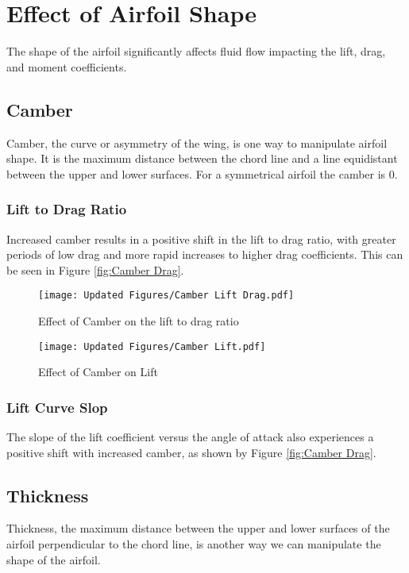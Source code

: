 \documentclass{article}
\begin{document}
\section{Effect of Airfoil Shape}
The shape of the airfoil significantly affects fluid flow impacting the lift, drag, and moment coefficients.
\subsection{Camber}
Camber, the curve or asymmetry of the wing, is one way to manipulate airfoil shape. It is the maximum distance between the chord line and a line equidistant between the upper and lower surfaces. For a symmetrical airfoil the camber is 0. 
\subsubsection{Lift to Drag Ratio}

Increased camber results in a positive shift in the lift to drag ratio, with greater periods of low drag and more rapid increases to higher drag coefficients. This can be seen in Figure \ref{fig:Camber Drag}.

\begin{figure}[h]
    \centering
\begin{minipage}[b]{0.45\textwidth}
\centering
\texttt{[image: Updated Figures/Camber Lift Drag.pdf]}
\caption{Effect of Camber on the lift to drag ratio}
\label{fig:Camber Drag}
\end{minipage}
\begin{minipage}[b]{0.45\textwidth}
\centering
\texttt{[image: Updated Figures/Camber Lift.pdf]}
\caption{Effect of Camber on Lift}
\label{fig:Camber Lift}
\end{minipage}
\end{figure}


\subsubsection{Lift Curve Slop}

The slope of the lift coefficient versus the angle of attack also experiences a positive shift with increased camber, as shown by Figure \ref{fig:Camber Drag}.


\subsection{Thickness}
Thickness, the maximum distance between the upper and lower surfaces of the airfoil perpendicular to the chord line, is another way we can manipulate the shape of the airfoil.
\end{document}
